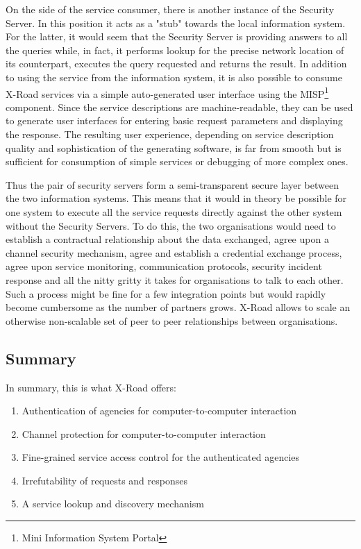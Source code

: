 \documentclass[10pt,a4paper]{article}
\begin{document}
\begin{appendices}
On the side of the service consumer, there is another instance of the Security Server. In this position it acts as a "stub" towards the local information system. For the latter, it would seem that the Security Server is providing answers to all the queries while, in fact, it performs lookup for the precise network location of its counterpart, executes the query requested and returns the result. In addition to using the service from the information system, it is also possible to consume X-Road services via a simple auto-generated user interface using the MISP\footnote{Mini Information System Portal} component. Since the service descriptions are machine-readable, they can be used to generate user interfaces for entering basic request parameters and displaying the response. The resulting user experience, depending on service description quality and sophistication of the generating software, is far from smooth but is sufficient for consumption of simple services or debugging of more complex ones.

Thus the pair of security servers form a semi-transparent secure layer between the two information systems. This means that it would in theory be possible for one system to execute all the service requests directly against the other system without the Security Servers. To do this, the two organisations would need to establish a contractual relationship about the data exchanged, agree upon a channel security mechanism, agree and establish a credential exchange process, agree upon service monitoring, communication protocols, security incident response and all the nitty gritty it takes for organisations to talk to each other. Such a process might be fine for a few integration points but would rapidly become cumbersome as the number of partners grows. X-Road allows to scale an otherwise non-scalable set of peer to peer relationships between organisations. 

\subsection{Summary}
In summary, this is what X-Road offers:

\begin{enumerate}
	\item Authentication of agencies for computer-to-computer interaction
	\item Channel protection for computer-to-computer interaction
	\item Fine-grained service access control for the authenticated agencies
	\item Irrefutability of requests and responses
	\item A service lookup and discovery mechanism   
\end{enumerate}


\end{appendices}
\end{document}
